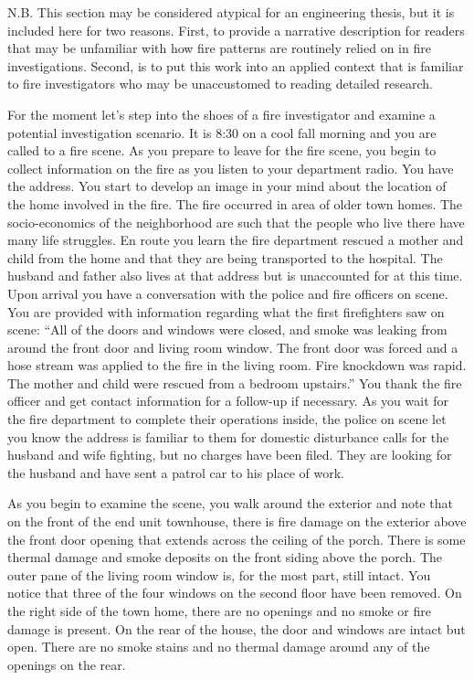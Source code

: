 \documentclass[twoside]{uocthesis}
\begin{document}
{N.B. This section may be considered atypical for an engineering thesis, but it is included here for two reasons.  First, to provide a narrative description for readers that may be unfamiliar with how fire patterns are routinely relied on in fire investigations.  Second, is to put this work into an applied context that is familiar to fire investigators who may be unaccustomed to reading detailed research.  

For the moment let's step into the shoes of a fire investigator and examine a potential investigation scenario.  It is 8:30 on a cool fall morning and you are called to a fire scene.  As you prepare to leave for the fire scene, you begin to collect information on the fire as you listen to your department radio.  You have the address.  You start to develop an image in your mind about the location of the home involved in the fire. The fire occurred in area of older town homes.  The socio-economics of the neighborhood are such that the people who live there have many life struggles. En route you learn the fire department rescued a mother and child from the home and that they are being transported to the hospital.  The husband and father also lives at that address but is unaccounted for at this time.  Upon arrival you have a conversation with the police and fire officers on scene.  You are provided with information regarding what the first firefighters saw on scene: ``All of the doors and windows were closed, and smoke was leaking from around the front door and living room window.  The front door was forced and a hose stream was applied to the fire in the living room.  Fire knockdown was rapid.  The mother and child were rescued from a bedroom upstairs.'' You thank the fire officer and get contact information for a follow-up if necessary.  As you wait for the fire department to complete their operations inside, the police on scene let you know the address is familiar to them for domestic disturbance calls for the husband and wife fighting, but no charges have been filed.  They are looking for the husband and have sent a patrol car to his place of work.  

As you begin to examine the scene, you walk around the exterior and note that on the front of the end unit townhouse, there is fire damage on the exterior above the front door opening that extends across the ceiling of the porch.  There is some thermal damage and smoke deposits on the front siding above the porch.  The outer pane of the living room window is, for the most part, still intact. You notice that three of the four windows on the second floor have been removed.  On the right side of the town home, there are no openings and no smoke or fire damage is present.  On the rear of the house, the door and windows are intact but open.  There are no smoke stains and no thermal damage around any of the openings on the rear. 

}
\end{document}
